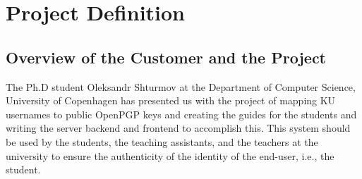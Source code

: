 \documentclass[11pt,a4paper]{article}
\begin{document}

\clearpage\maketitle
\thispagestyle{empty}

\newpage
\tableofcontents{}
\thispagestyle{empty}


\newpage


\section{Project Definition}
\subsection{Overview of the Customer and the Project}
The Ph.D student Oleksandr Shturmov at the Department of Computer Science, University of Copenhagen has presented us with the project of mapping KU usernames to public OpenPGP keys and creating the guides for the students and writing the server backend and frontend to accomplish this. This system should be used by the students, the teaching assistants, and the teachers at the university to ensure the authenticity of the identity of the end-user, i.e., the student.
\end{document}
